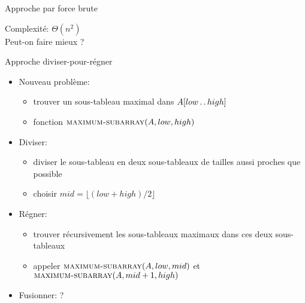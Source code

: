 \begin{frame}{Approche par force brute}

\begin{center}
{\small
{}
}
\end{center}

Complexité: $\Theta(n^2)$\\

Peut-on faire mieux ?

\end{frame}

\begin{frame}{Approche diviser-pour-régner}

\begin{itemize}
\item Nouveau problème:
\begin{itemize}
\item trouver un sous-tableau maximal dans $A[low\mathinner{\ldotp\ldotp} high]$
\item fonction $\textnormal{\scshape maximum-subarray}(A,low,high)$
\end{itemize}
\item Diviser:
\begin{itemize}
\item diviser le sous-tableau en deux sous-tableaux de tailles aussi proches que possible
\item choisir $mid=\lfloor (low+high)/2 \rfloor$
\end{itemize}
\item Régner:
\begin{itemize}
\item trouver récursivement les sous-tableaux maximaux dans ces deux sous-tableaux
\item appeler $\textnormal{\scshape maximum-subarray}(A,low,mid)$ et $\textnormal{\scshape maximum-subarray}(A,mid+1,high)$
\end{itemize}
\item Fusionner: ?
\end{itemize}

\end{frame}

